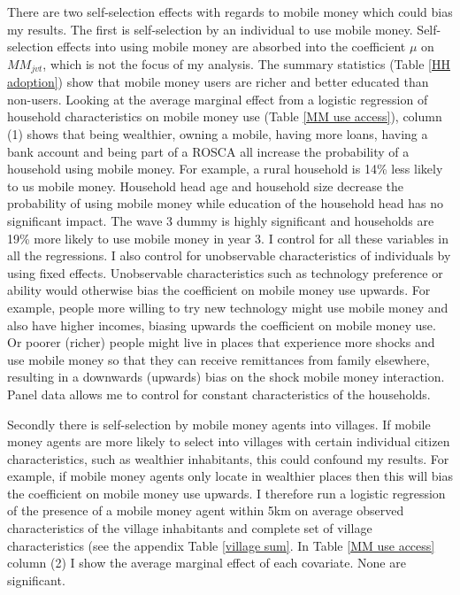 There are two self-selection effects with regards to mobile money which could bias my results. The first is self-selection by an individual to use mobile money. Self-selection effects into using mobile money are absorbed into the coefficient $\mu$ on $MM_{jvt}$, which is not the focus of my analysis. The summary statistics (Table \ref{HH adoption}) show that mobile money users are richer and better educated than non-users. Looking at the average marginal effect from a logistic regression of household characteristics on mobile money use (Table \ref{MM use access}), column (1) shows that being wealthier, owning a mobile, having more loans, having a bank account and being part of a ROSCA all increase the probability of a household using mobile money. For example, a rural household is 14\% less likely to us mobile money. Household head age and household size decrease the probability of using mobile money while education of the household head has no significant impact. The wave 3 dummy is highly significant and households are 19\% more likely to use mobile money in year 3. I control for all these variables in all the regressions. I also control for unobservable characteristics of individuals by using fixed effects. Unobservable characteristics such as technology preference or ability would otherwise bias the coefficient on mobile money use upwards. For example, people more willing to try new technology might use mobile money and also have higher incomes, biasing upwards the coefficient on mobile money use. Or poorer (richer) people might live in places that experience more shocks and use mobile money so that they can receive remittances from family elsewhere, resulting in a downwards (upwards) bias on the shock mobile money interaction. Panel data allows me to control for constant characteristics of the households.  




Secondly there is self-selection by mobile money agents into villages. If mobile money agents are more likely to select into villages with certain individual citizen characteristics, such as wealthier inhabitants, this could confound my results. For example, if mobile money agents only locate in wealthier places then this will bias the coefficient on mobile money use upwards. I therefore run a logistic regression of the presence of a mobile money agent within 5km on average observed characteristics of the village inhabitants and complete set of village characteristics (see the appendix Table \ref{village sum}. In Table \ref{MM use access} column (2) I show the average marginal effect of each covariate. None are significant.  

